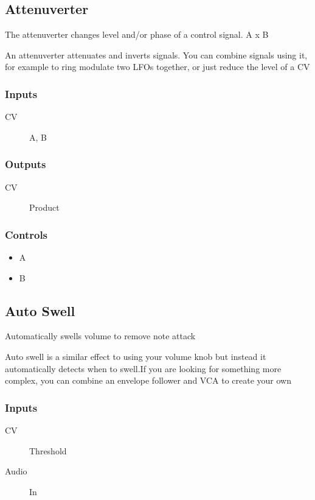 \subsection{Attenuverter}

The attenuverter changes level and/or phase of a control signal. A x B

An attenuverter attenuates and inverts signals.
                  You can combine signals using it, for example to ring modulate two LFOs together, or just reduce the level of a CV

\subsubsection{Inputs}
\begin{description}
\item [CV] A, B
\end{description}

\subsubsection{Outputs}
\begin{description}
\item [CV] Product
\end{description}

\subsubsection{Controls}
\begin{itemize}
\item A
\item B
\end{itemize}

\subsection{Auto Swell}

Automatically swells volume to remove note attack

Auto swell is a similar effect to using your volume knob but instead it automatically detects when to swell.If you are looking for something more complex, you can combine an envelope follower and VCA to create your own

\subsubsection{Inputs}
\begin{description}
\item [CV] Threshold
\item [Audio] In
\end{description}

